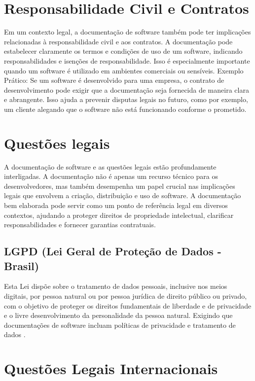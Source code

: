 \documentclass[12pt,oneside,a4paper,article]{abntex2}
\begin{document}
\section{Responsabilidade Civil e Contratos}
Em um contexto legal, a documentação de software também pode ter implicações
relacionadas à responsabilidade civil e aos contratos. A documentação pode estabelecer claramente os termos e condições de uso de um software, indicando
responsabilidades e isenções de responsabilidade. Isso é especialmente importante quando um software é utilizado em ambientes comerciais ou sensíveis.
Exemplo Prático: Se um software é desenvolvido para uma empresa, o contrato de desenvolvimento pode exigir que a documentação seja fornecida de
maneira clara e abrangente. Isso ajuda a prevenir disputas legais no futuro,
como por exemplo, um cliente alegando que o software não está funcionando
conforme o prometido.

\section{Questões legais}

A documentação de software e as questões legais estão profundamente interligadas. A documentação não é apenas um recurso técnico para os desenvolvedores, mas também desempenha um papel crucial nas implicações legais que envolvem a criação, distribuição e uso de software. A documentação bem elaborada pode servir como um ponto de referência legal em diversos contextos,
ajudando a proteger direitos de propriedade intelectual, clarificar responsabilidades e fornecer garantias contratuais.

\subsection{LGPD (Lei Geral de Proteção de Dados - Brasil)}
Esta Lei dispõe sobre o tratamento de dados
pessoais, inclusive nos meios digitais, por pessoa natural ou por pessoa jurídica de direito público ou privado, com o objetivo de proteger os direitos fundamentais de liberdade e de privacidade e o livre desenvolvimento da personalidade da pessoa natural. Exigindo que documentações de software incluam políticas de privacidade e tratamento de dados \cite{LGPD}.

\section{Questões Legais Internacionais}
\end{document}
